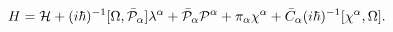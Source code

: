 \begin{equation}\label{6.12}
H={\cal H}+(i\hbar)^{-1}[\Omega,\bar{\cal P}_\alpha]\lambda^\alpha+
\bar{\cal P}_\alpha{\cal P}^\alpha+\pi_\alpha\chi^\alpha+
\bar{C}_\alpha(i\hbar)^{-1}[\chi^\alpha,\Omega].
\end{equation}

